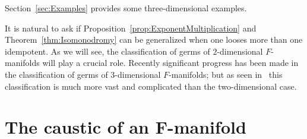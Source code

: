 \documentclass[pdftex]{sigma}
\numberwithin{equation}{section}
\begin{document}
 Section~\ref{sec:Examples} provides some three-dimensional examples.

It is natural to ask if Proposition~\ref{prop:ExponentMultiplication} and Theorem~\ref{thm:Isomonodromy} can be generalized when one looses more than one idempotent. As we will see, the classification of germs of $2$-dimensional $F$-manifolds will play a crucial role. Recently significant progress has been made in the classification of germs of $3$-dimensional $F$-manifolds; but as seen in~\cite{Basalaev_2021} this classification is much more vast and complicated than the two-dimensional case.

\section[The caustic of an F-manifold]{The caustic of an $\boldsymbol{F}$-manifold}
\label{sec:FManifolds}
\end{document}
